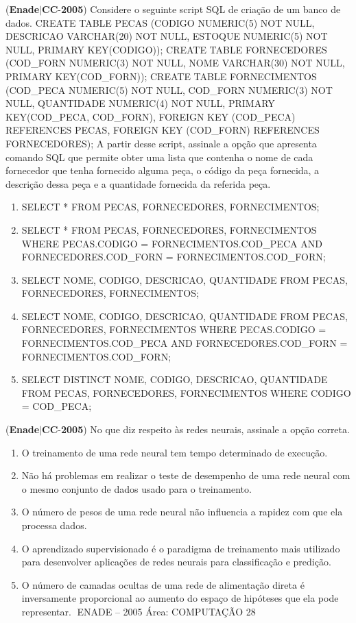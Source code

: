 \documentclass{exam}
\begin{document}
\begin{questions}
\question (\textbf{Enade}$|$\textbf{CC}-\textbf{2005}) Considere o seguinte script SQL de criação de um banco de
dados.
CREATE TABLE PECAS (CODIGO NUMERIC(5) NOT NULL,
DESCRICAO VARCHAR(20) NOT NULL,
ESTOQUE NUMERIC(5) NOT NULL,
PRIMARY KEY(CODIGO));
CREATE TABLE FORNECEDORES
(COD\_FORN NUMERIC(3) NOT NULL,
NOME VARCHAR(30) NOT NULL,
PRIMARY KEY(COD\_FORN));
CREATE TABLE FORNECIMENTOS
(COD\_PECA NUMERIC(5) NOT NULL,
COD\_FORN NUMERIC(3) NOT NULL,
QUANTIDADE NUMERIC(4) NOT NULL,
PRIMARY KEY(COD\_PECA, COD\_FORN),
FOREIGN KEY (COD\_PECA) REFERENCES PECAS,
FOREIGN KEY (COD\_FORN) REFERENCES
FORNECEDORES);
A partir desse script, assinale a opção que apresenta comando
SQL que permite obter uma lista que contenha o nome de cada
fornecedor que tenha fornecido alguma peça, o código da peça
fornecida, a descrição dessa peça e a quantidade fornecida da
referida peça.
	\begin{enumerate}[label=\alph*)]
		\item  SELECT * FROM PECAS, FORNECEDORES,
FORNECIMENTOS;
		\item  SELECT * FROM PECAS, FORNECEDORES,
FORNECIMENTOS WHERE PECAS.CODIGO =
FORNECIMENTOS.COD\_PECA AND
FORNECEDORES.COD\_FORN =
FORNECIMENTOS.COD\_FORN;
		\item  SELECT NOME, CODIGO, DESCRICAO, QUANTIDADE
FROM PECAS, FORNECEDORES, FORNECIMENTOS;
		\item  SELECT NOME, CODIGO, DESCRICAO, QUANTIDADE
FROM PECAS, FORNECEDORES, FORNECIMENTOS
WHERE PECAS.CODIGO = FORNECIMENTOS.COD\_PECA
AND FORNECEDORES.COD\_FORN =
FORNECIMENTOS.COD\_FORN;
		\item  SELECT DISTINCT NOME, CODIGO, DESCRICAO,
QUANTIDADE
FROM PECAS, FORNECEDORES, FORNECIMENTOS
WHERE CODIGO = COD\_PECA;

	\end{enumerate}

\question (\textbf{Enade}$|$\textbf{CC}-\textbf{2005}) No que diz respeito às redes neurais, assinale a opção correta.
	\begin{enumerate}[label=\alph*)]
		\item  O treinamento de uma rede neural tem tempo determinado de
execução.
		\item  Não há problemas em realizar o teste de desempenho de uma
rede neural com o mesmo conjunto de dados usado para o
treinamento.
		\item  O número de pesos de uma rede neural não influencia a
rapidez com que ela processa dados.
		\item  O aprendizado supervisionado é o paradigma de treinamento
mais utilizado para desenvolver aplicações de redes neurais
para classificação e predição.
		\item  O número de camadas ocultas de uma rede de alimentação
direta é inversamente proporcional ao aumento do espaço de
hipóteses que ela pode representar.
ENADE – 2005 Área: COMPUTAÇÃO 28


\end{enumerate}
\end{questions}
\end{document}
